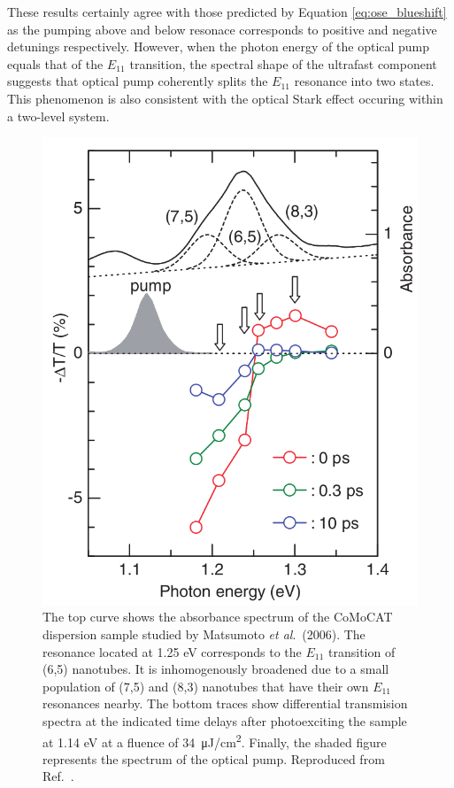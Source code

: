 These results certainly agree with those predicted by Equation \eqref{eq:ose_blueshift} as the pumping above and below resonace corresponds to positive and negative detunings respectively. However, when the photon energy of the optical pump equals that of the $E_{11}$ transition, the spectral shape of the ultrafast component suggests that optical pump coherently splits the $E_{11}$ resonance into two states. This phenomenon is also consistent with the optical Stark effect occuring within a two-level system.

\begin{figure}[H]
	\centering
	\includegraphics[scale=1.25]{images/chapter_prior_works/abs_dtt_matsumoto}
	\caption{The top curve shows the absorbance spectrum of the CoMoCAT dispersion sample studied by Matsumoto \textit{et al}.\ (2006). The resonance located at 1.25 eV corresponds to the $E_{11}$ transition of (6,5) nanotubes. It is inhomogenously broadened due to a small population of (7,5) and (8,3) nanotubes that have their own $E_{11}$ resonances nearby. The bottom traces show differential transmision spectra at the indicated time delays after photoexciting the sample at 1.14 eV at a fluence of \SI{34}{\micro \joule / \cm\squared}. Finally, the shaded figure represents the spectrum of the optical pump. Reproduced from Ref.\ \cite{matsumoto2006optical}.}
	\label{fig:abs_dtt_matsumoto}
\end{figure}

